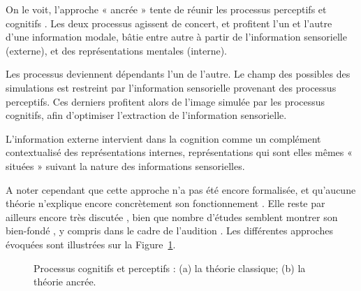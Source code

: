 On le voit, l'approche « ancrée » tente de réunir les processus perceptifs et cognitifs \citep{goldstone1998reuniting}. Les deux processus agissent de concert, et profitent l'un et l'autre d'une information modale, bâtie entre autre à partir de l'information sensorielle (externe), et des représentations mentales (interne).

Les processus deviennent dépendants l'un de l'autre. Le champ des possibles des simulations est restreint par l'information sensorielle provenant des processus perceptifs. Ces derniers profitent alors de l'image simulée par les processus cognitifs, afin d'optimiser l'extraction de l'information sensorielle.

L'information externe intervient dans la cognition comme un complément contextualisé des représentations internes, représentations qui sont elles mêmes « situées » suivant la nature des informations sensorielles.

A noter cependant que cette approche n'a pas été encore formalisée, et qu'aucune théorie n'explique encore concrètement son fonctionnement \citep{barsalou2010grounded}. Elle reste par ailleurs encore très discutée \citep{leshinskaya2016cognitive,barsalou2016staying}, bien que nombre d'études semblent montrer son bien-fondé \citep{barsalou1999perceptions,barsalou2003abstraction,barsalou2010grounded}, y compris dans le cadre de l'audition \citep{kiefer2008sound}. Les différentes approches évoquées sont illustrées sur la Figure~\ref{fig:processusPercepAndCo}.

\begin{figure}[t]
         \myfloatalign
         \par
        \caption[Processus cognitifs et perceptifs.]{Processus cognitifs et perceptifs : (a) la théorie classique; (b) la théorie ancrée.}
        \label{fig:processusPercepAndCo}
\end{figure}

